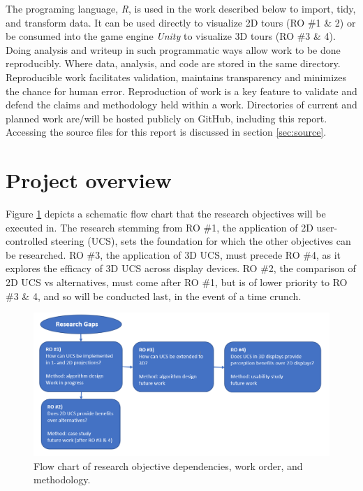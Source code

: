 \documentclass{monashthesis}
\begin{document}
The programing language, \emph{R}, is used in the work described below to import, tidy, and transform data. It can be used directly to visualize 2D tours (RO \#1 \& 2) or be consumed into the game engine \emph{Unity} to visualize 3D tours (RO \#3 \& 4). Doing analysis and writeup in such programmatic ways allow work to be done reproducibly. Where data, analysis, and code are stored in the same directory. Reproducible work facilitates validation, maintains transparency and minimizes the chance for human error. Reproduction of work is a key feature to validate and defend the claims and methodology held within a work. Directories of current and planned work are/will be hosted publicly on GitHub, including this report. Accessing the source files for this report is discussed in section \ref{sec:source}.

\hypertarget{ch:projectoverview}{%
\section{Project overview}\label{ch:projectoverview}}

Figure \ref{fig:ProjectOverview} depicts a schematic flow chart that the research objectives will be executed in. The research stemming from RO \#1, the application of 2D user-controlled steering (UCS), sets the foundation for which the other objectives can be researched. RO \#3, the application of 3D UCS, must precede RO \#4, as it explores the efficacy of 3D UCS across display devices. RO \#2, the comparison of 2D UCS vs alternatives, must come after RO \#1, but is of lower priority to RO \#3 \& 4, and so will be conducted last, in the event of a time crunch.



\begin{figure}

{\centering \includegraphics[width=1\linewidth]{./figures/ProjectOverview} 

}

\caption{Flow chart of research objective dependencies, work order, and methodology.}\label{fig:ProjectOverview}
\end{figure}
\end{document}
